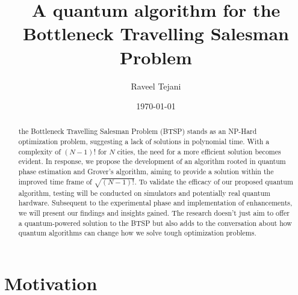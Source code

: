 \documentclass[twocolumn,showpacs,preprintnumbers,amsmath,amssymb]{revtex4}
\begin{document}
		
		\title{A quantum algorithm for the Bottleneck Travelling Salesman Problem}
		
		\author{Raveel Tejani}
		
		\date{\today}
		
		\begin{abstract}
			
			the Bottleneck Travelling Salesman Problem (BTSP) stands as an NP-Hard optimization problem, suggesting a lack of solutions in polynomial time.
			With a complexity of $(N-1)!$ for $N$ cities, the need for a more efficient solution becomes evident. In response, we propose the development of an algorithm rooted in quantum phase estimation and Grover's algorithm, aiming to provide a solution within the improved time frame of $\sqrt{(N-1)!}$. To validate the efficacy of our proposed quantum algorithm, testing will be conducted on simulators and potentially real quantum hardware. Subsequent to the experimental phase and implementation of enhancements, we will present our findings and insights gained. The research doesn't just aim to offer a quantum-powered solution to the BTSP but also adds to the conversation about how quantum algorithms can change how we solve tough optimization problems.
			
		\end{abstract}
		
		\maketitle
		
		
		\section{Motivation}
		
\end{document}
